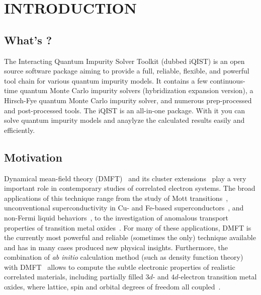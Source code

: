 \chapter{INTRODUCTION}
\section{What's {\iqist}?}

The Interacting Quantum Impurity Solver Toolkit (dubbed iQIST) is an open
source software package aiming to provide a full, reliable, flexible, and
powerful tool chain for various quantum impurity models. It contains a few
continuous-time quantum Monte Carlo impurity solvers (hybridization
expansion version), a Hirsch-Fye quantum Monte Carlo impurity solver, and
numerous prep-processed and post-processed tools. The iQIST is an all-in-one
package. With it you can solve quantum impurity models and anaylyze the
calculated results easily and efficiently.


\section{Motivation}

Dynamical mean-field theory (DMFT)~\cite{RevModPhys.68.13} and its cluster extensions~\cite{RevModPhys.77.1027,RevModPhys.78.865} play a very important role in contemporary studies of correlated electron systems. The broad applications of this technique range from the study of Mott transitions~\cite{PhysRevB.54.8452,PhysRevLett.101.186403}, unconventional superconductivity in Cu- and Fe-based superconductors~\cite{PhysRevLett.96.047005,Yin2011,PhysRevLett.106.047004,Wang13,PhysRevLett.110.216405,PhysRevB.88.245110}, and non-Fermi liquid behaviors~\cite{PhysRevLett.102.206407,PhysRevLett.108.216401,PhysRevLett.110.086401}, to the investigation of anomalous transport properties of transition metal oxides~\cite{RevModPhys.70.1039}. For many of these applications, DMFT is the currently most powerful and reliable (sometimes the only) technique available and has in many cases produced new physical insights. Furthermore, the combination of \emph{ab initio} calculation method (such as density function theory) with DMFT~\cite{RevModPhys.78.865} allows to compute the subtle electronic properties of realistic correlated materials, including partially filled $3d$- and $4d$-electron transition metal oxides, where lattice, spin and orbital degrees of freedom all coupled~\cite{RevModPhys.70.1039}.

